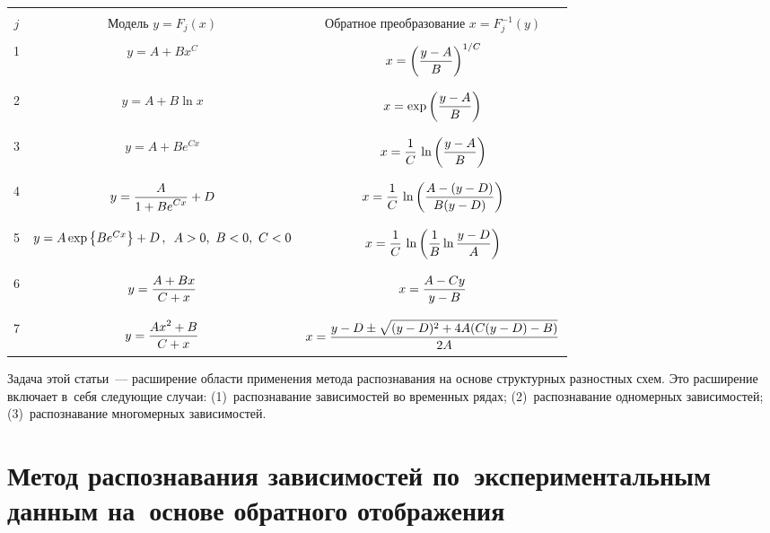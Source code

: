\begin{multicols}{2}
\begin{table*}[b]\small
\begin{center}
\vspace*{2ex}

\begin{tabular}{|c|c|c|}
\hline
&&\\[-8pt]
$j$&Модель $y=F_j(x)$ &Обратное преобразование $x=F_j^{-1}(y)$\\[3pt]
\hline
&&\\[-8pt]
1&$y=A+Bx^C$&$x=\left( \fr{y-A}{B}\right)^{1/C}$\\
&&\\[-8pt]
\hline
&&\\[-8pt]
2&$y=A+B\ln x$&$x=\exp \left( \fr{y-A}{B}\right)$\\
&&\\[-8pt]
\hline
&&\\[-8pt]
3&$y=A+B e^{Cx}$&$x=\fr{1}{C}\,\ln \left( \fr{y-A}{B}\right)$\\
&&\\[-8pt]
\hline
&&\\[-8pt]
4&$y=\fr{A}{1+Be^{Cx}}+D$&$x=\fr{1}{C}\,\ln \left( \fr{A- (y-D)}{B(y-
D)}\right)$\\
&&\\[-8pt]
\hline
&&\\[-8pt]
5&$y=A\exp \left\{ Be^{Cx}\right\}+D\,,\enskip A>0,\ B<0,\ 
C<0$&$x=\fr{1}{C}\,\ln \left( \fr{1}{B}\ln \fr{y-D}{A}\right)$\\
&&\\[-8pt]
\hline
&&\\[-8pt]
6&$y=\fr{A+Bx}{C+x}$&$x=\fr{A-Cy}{y-B}$\\
&&\\[-8pt]
\hline
&&\\[-8pt]
7&$y=\fr{Ax^2+B}{C+x}$&$x=\fr{y-D\pm \sqrt{(y-D)^2 +4A(C(y-D)-B)}}{2A}$
\\[8pt]
\hline
\end{tabular}
\end{center}
\end{table*}

  
  Задача этой статьи~--- расширение области применения метода 
распознавания на основе структурных разностных схем. Это расширение 
включает в~себя следующие случаи: (1)~распознавание зависимостей во 
временных рядах; (2)~распознавание одномерных зависимостей; 
(3)~распознавание многомерных зависимостей.
  
\section{Метод распознавания зависимостей по~экспериментальным 
данным на~основе обратного отображения}


\end{multicols}
